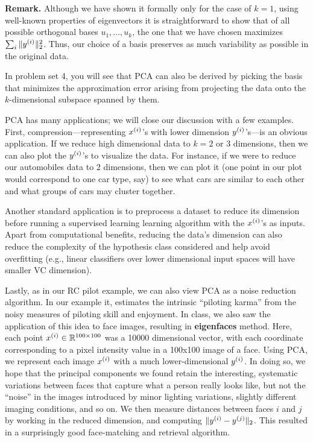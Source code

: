 \documentclass{article}
\begin{document}
\medskip
\noindent
{\bf Remark.} Although we have shown it formally only for the case of $k=1$, using well-known properties of eigenvectors it is straightforward to show that of all possible orthogonal bases $u_1, \ldots, u_k$, the one that we have chosen maximizes $\sum_i \|{y^{(i)}}\|_2^2$. Thus, our choice of a basis preserves as much variability as possible in the original data.
\medskip

In problem set 4, you will see that PCA can also be derived by picking the basis that minimizes the approximation error arising from projecting the data onto the $k$-dimensional subspace spanned by them.

PCA has many applications; we will close our discussion with a few examples. First, compression---representing ${x^{(i)}}$'s with lower dimension ${y^{(i)}}$'s---is an obvious application. If we reduce high dimensional data to $k=2$ or $3$ dimensions, then we can also plot the ${y^{(i)}}$'s to visualize the data. For instance, if we were to reduce our automobiles data to 2 dimensions, then we can plot it (one point in our plot would correspond to one car type, say) to see what cars are similar to each other and what groups of cars may cluster together.

Another standard application is to preprocess a dataset to reduce its dimension before running a supervised learning learning algorithm with the ${x^{(i)}}$'s as inputs. Apart from computational benefits, reducing the data's dimension can also reduce the complexity of the hypothesis class considered and help avoid overfitting (e.g., linear classifiers over lower dimensional input spaces will have smaller VC dimension).

Lastly, as in our RC pilot example, we can also view PCA as a noise reduction algorithm. In our example it, estimates the intrinsic ``piloting karma'' from the noisy measures of piloting skill and enjoyment. In class, we also saw the application of this idea to face images, resulting in {\bf eigenfaces} method. Here, each point ${x^{(i)}} \in {\mathbb R}^{100\times 100}$ was a 10000 dimensional vector, with each coordinate corresponding to a pixel intensity value in a 100x100 image of a face. Using PCA, we represent each image ${x^{(i)}}$ with a much lower-dimensional ${y^{(i)}}$. In doing so, we hope that the principal components we found retain the interesting, systematic variations between faces that capture what a person really looks like, but not the ``noise'' in the images introduced by minor lighting variations, slightly different imaging conditions, and so on. We then measure distances between faces $i$ and $j$ by working in the reduced dimension, and computing $\|{y^{(i)}} - {y^{(j)}}\|_2$. This resulted in a surprisingly good face-matching and retrieval algorithm.

\end{document}

